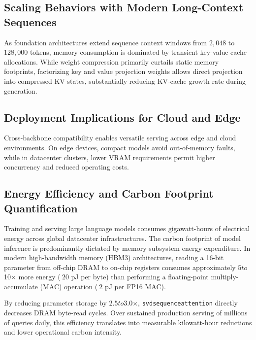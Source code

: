 \subsection{Scaling Behaviors with Modern Long-Context Sequences}
As foundation architectures extend sequence context windows from $2{,}048$ to $128{,}000$ tokens, memory consumption is dominated by transient key-value cache allocations. While weight compression primarily curtails static memory footprints, factorizing key and value projection weights allows direct projection into compressed KV states, substantially reducing KV-cache growth rate during generation.

\subsection{Deployment Implications for Cloud and Edge}
Cross-backbone compatibility enables versatile serving across edge and cloud environments. On edge devices, compact models avoid out-of-memory faults, while in datacenter clusters, lower VRAM requirements permit higher concurrency and reduced operating costs.

\subsection{Energy Efficiency and Carbon Footprint Quantification}
Training and serving large language models consumes gigawatt-hours of electrical energy across global datacenter infrastructures. The carbon footprint of model inference is predominantly dictated by memory subsystem energy expenditure. In modern high-bandwidth memory (HBM3) architectures, reading a 16-bit parameter from off-chip DRAM to on-chip registers consumes approximately $5$\times$ to $10$\times$ more energy ($~20$ pJ per byte) than performing a floating-point multiply-accumulate (MAC) operation ($~2$ pJ per FP16 MAC).

By reducing parameter storage by $2.5$\times$ to $3.0$\times$, \texttt{svdsequenceattention} directly decreases DRAM byte-read cycles. Over sustained production serving of millions of queries daily, this efficiency translates into measurable kilowatt-hour reductions and lower operational carbon intensity.
